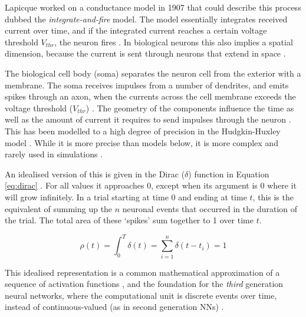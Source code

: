 \documentclass[report.tex]{subfiles}
\begin{document}
Lapicque worked on a conductance model in 1907 that could describe this
process dubbed the \textit{integrate-and-fire} 
model.
The model essentially integrates received current over time, and
if the integrated current reaches a certain voltage threshold $V_{thr}$, the neuron
fires \cite{Dayan2001, Eliasmith2004}.
In biological neurons this also implies a spatial dimension, because the
current is sent through	neurons that extend in space \cite{Dayan2001}.

The biological cell body (soma) separates the neuron cell from the
exterior with a membrane.
The soma receives impulses from a number
of dendrites, and emits spikes through an 
axon, when the currents across the cell membrane exceeds the
voltage threshold ($V_{thr}$) \cite{Dayan2001}.
The geometry of the components influence the time as well as the amount of current
it requires to send impulses through the neuron \cite{Eliasmith2004}.
This has been modelled to a high degree of precision in the 
Hudgkin-Huxley model \cite{Dayan2001}.
While it is more precise than models below, it is
more complex \cite[p. 195]{Dayan2001} and rarely used in simulations
\cite{Albada2018, Dayan2001, Eliasmith2015}.

An idealised version of this is given in the Dirac ($\delta$) function 
in Equation \ref{eq:dirac} \cite[p. 404]{Dayan2001}.
For all values it approaches 0, except when its argument is
0 where it will grow infinitely.
In a trial starting at time $0$ and ending at time $t$, this
is the equivalent of summing up the $n$ neuronal events that occurred in 
the duration of the trial.
The total area of these `spikes' sum together to 1 over time $t$. 

\begin{equation} \label{eq:dirac}
  \rho(t) = \int_0^T \delta(t) = \sum_{i=1}^n \delta(t - t_i) = 1
\end{equation}

This idealised representation is a common mathematical approximation of
a sequence of activation functions \cite{Dayan2001, Eliasmith2004},
and the foundation for the \textit{third} generation
neural networks, where the computational unit is discrete events over time,
instead of continuous-valued (as in second generation \glspl{NN})
\cite{Maass1997}.
\end{document}
